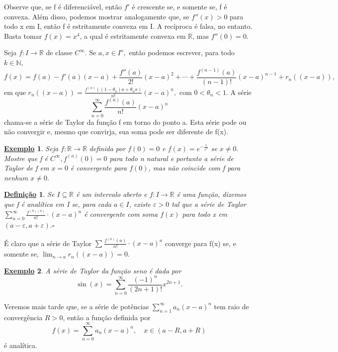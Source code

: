 \documentclass{article}
\newtheorem*{def*}{\underline{Defini\c c\~ao}}
\newtheorem{example}{\underline{Exemplo}}
\begin{document}
  Observe que, se f é diferenciável, então \(f'\) é crescente se, e somente se,
f é convexa. Além disso, podemos mostrar analogamente que, se \(f''(x) > 0\) para
todo x em I, então f é estritamente convexa em I. A recíproca é falsa, no entanto.
Basta tomar \(f(x) = x^{4}\), a qual é estritamente convexa em \(\mathbb{R}\), mas
 \(f''(0) = 0.\)

  Seja \(f:I\rightarrow \mathbb{R}\) de classe \(C^{\infty}.\) Se \(a, x\in I^{o},\) então
podemos escrever, para todo \(k\in \mathbb{N},\) 
  \[
  f(x) = f(a) - f'(a)(x-a) + \frac{f''(a)}{2!}(x-a)^{2} + \cdots + \frac{f^{(n-1)}(a)}{(n-1)!}(x-a)^{n-1} + r_{n}((x-a)),
  \]
  em que \(r_{n}((x-a))=\frac{f^{(n)}((1-\theta_{n})a+\theta_{n}x)}{n!}(x-a)^{n},\) com
 \(0 < \theta_{n} < 1.\) A série 
   \[
     \sum\limits_{n=0}^{\infty}\frac{f^{(n)}(a)}{n!}(x-a)^{n}
   \]
chama-se a série de Taylor da fun\c cão f em torno do ponto a. Esta série
pode ou não convergir e, mesmo que convirja, sua soma pode ser diferente
de f(x).
\begin{example}
  Seja \(f:\mathbb{R}\rightarrow \mathbb{R}\) definida por \(f(0)=0\) e 
 \(f(x)=e^{-\frac{1}{x^{2}}}\) se \(x\neq0.\) Mostre que f é \(C^{\infty}, f^{(n)}(0)=0\)
 para todo n natural e portanto a série de Taylor de f em \(x=0\) é convergente para
 \(f(0)\), mas não coincide com f para nenhum \(x\neq0.\)
\end{example}
\begin{def*}
  Se \(I\subseteq{\mathbb{R}}\) é um intervalo aberto e \(f:I\rightarrow \mathbb{R}\)
é uma fun\c cão, dizemos que f é analítica em I se, para cada \(a\in I\), existe
 \(\varepsilon >0\) tal que a série de Taylor \(\sum\limits_{n=0}^{\infty}\frac{f^{(n)(a)}}{n!}\cdot (x-a)^{n}\)
 é convergente com soma \(f(x)\) para todo x em \((a-\varepsilon, a+\varepsilon ).\square\)
\end{def*}
  É claro que a série de Taylor \(\sum\limits_{}^{}\frac{f^{(n)}(a)}{n!}\cdot (x-a)^{n}\) converge
  para f(x) se, e somente se, \(\lim_{n\to a}r_{n}((x-a))=0.\)
 \begin{example}
   A série de Taylor da fun\c cão seno é dada por 
     \[
       \sin{(x)} = \sum\limits_{n=0}^{\infty}\frac{(-1)^{n}}{(2n+1)!}x^{2n+1}.
     \]
 \end{example}
  Veremos mais tarde que, se a série de potências \(\sum\limits_{n=1}^{\infty}a_{n}(x-a)^{n}\)
tem raio de convergência \(R>0\), então a fun\c cão definida por 
  \[
    f(x) = \sum\limits_{n=0}^{\infty}a_{n}(x-a)^{n}, \quad x\in(a-R, a+R)
  \]
  é analítica.
\end{document}
